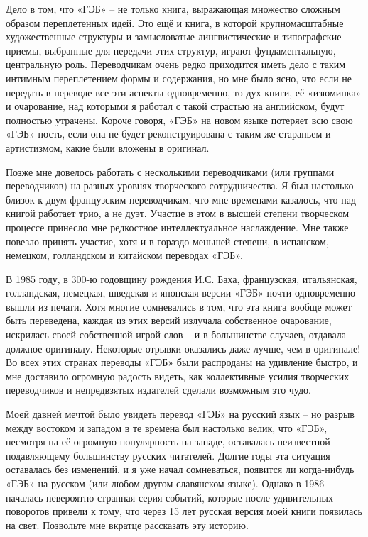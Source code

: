 \documentclass[../main.tex]{subfiles}
\begin{document}
Дело в том, что «ГЭБ» \--- не только книга, выражающая множество сложным образом переплетенных идей.
Это ещё и книга, в которой крупномасштабные художественные структуры и замысловатые лингвистические и типографские приемы, выбранные для передачи этих структур, играют фундаментальную, центральную роль.
Переводчикам очень редко приходится иметь дело с таким интимным переплетением формы и содержания, но мне было ясно, что если не передать в переводе все эти аспекты одновременно, то дух книги, её «изюминка» и очарование, над которыми я работал с такой страстью на английском, будут полностью утрачены.
Короче говоря, «ГЭБ» на новом языке потеряет всю свою «ГЭБ»-ность, если она не будет реконструирована с таким же стараньем и артистизмом, какие были вложены в оригинал.

Позже мне довелось работать с несколькими переводчиками (или группами переводчиков) на разных уровнях творческого сотрудничества.
Я был настолько близок к двум французским переводчикам, что мне временами казалось, что над книгой работает трио, а не дуэт.
Участие в этом в высшей степени творческом процессе принесло мне редкостное интеллектуальное наслаждение.
Мне также повезло принять участие, хотя и в гораздо меньшей степени, в испанском, немецком, голландском и китайском переводах «ГЭБ».

В 1985 году, в 300-ю годовщину рождения И.С.
Баха, французская, итальянская, голландская, немецкая, шведская и японская версии «ГЭБ» почти одновременно вышли из печати.
Хотя многие сомневались в том, что эта книга вообще может быть переведена, каждая из этих версий излучала собственное очарование, искрилась своей собственной игрой слов \--- и в большинстве случаев, отдавала должное оригиналу.
Некоторые отрывки оказались даже лучше, чем в оригинале!
Во всех этих странах переводы «ГЭБ» были распроданы на удивление быстро, и мне доставило огромную радость видеть, как коллективные усилия творческих переводчиков и непредвзятых издателей сделали возможным это чудо.

Моей давней мечтой было увидеть перевод «ГЭБ» на русский язык \--- но разрыв между востоком и западом в те времена был настолько велик, что «ГЭБ», несмотря на её огромную популярность на западе, оставалась неизвестной подавляющему большинству русских читателей.
Долгие годы эта ситуация оставалась без изменений, и я уже начал сомневаться, появится ли когда-нибудь «ГЭБ» на русском (или любом другом славянском языке).
Однако в 1986 началась невероятно странная серия событий, которые после удивительных поворотов привели к тому, что через 15 лет русская версия моей книги появилась на свет.
Позвольте мне вкратце рассказать эту историю.
\end{document}
